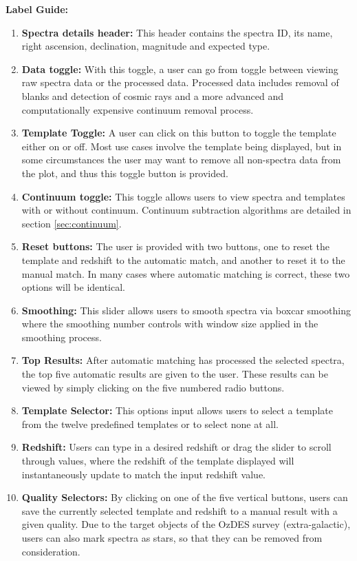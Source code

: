 \documentclass[titlesmallcaps, examinerscopy, copyrightpage]{uqthesis}
\begin{document}
\textbf{Label Guide:}
\begin{enumerate}
\item \textbf{Spectra details header:} This header contains the spectra ID, its name, right ascension, declination, magnitude and expected type.
\item \textbf{Data toggle:} With this toggle, a user can go from toggle between viewing raw spectra data or the processed data. Processed data includes removal of blanks and detection of cosmic rays and a more advanced and computationally expensive continuum removal process.
\item \textbf{Template Toggle:} A user can click on this button to toggle the template either on or off. Most use cases involve the template being displayed, but in some circumstances the user may want to remove all non-spectra data from the plot, and thus this toggle button is provided.
\item \textbf{Continuum toggle:} This toggle allows users to view spectra and templates with or without continuum. Continuum subtraction algorithms are detailed in section \ref{sec:continuum}.
\item \textbf{Reset buttons:} The user is provided with two buttons, one to reset the template and redshift to the automatic match, and another to reset it to the manual match. In many cases where automatic matching is correct, these two options will be identical.
\item \textbf{Smoothing:} This slider allows users to smooth spectra via boxcar smoothing where the smoothing number controls with window size applied in the smoothing process.
\item \textbf{Top Results:} After automatic matching has processed the selected spectra, the top five automatic results are given to the user. These results can be viewed by simply clicking on the five numbered radio buttons.
\item \textbf{Template Selector:} This options input allows users to select a template from the twelve predefined templates or to select none at all.
\item \textbf{Redshift:} Users can type in a desired redshift or drag the slider to scroll through values, where the redshift of the template displayed will instantaneously update to match the input redshift value.
\item \textbf{Quality Selectors:} By clicking on one of the five vertical buttons, users can save the currently selected template and redshift to a manual result with a given quality. Due to the target objects of the OzDES survey (extra-galactic), users can also mark spectra as stars, so that they can be removed from consideration.

\end{enumerate}
\end{document}
